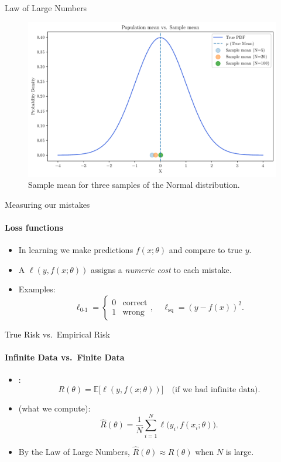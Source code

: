 \begin{frame}{Law of Large Numbers}
  \begin{figure}
    \centering
    \includegraphics[height=0.65\textheight]{images/pop_mean_vs_sample_mean.pdf}
    \caption{Sample mean for three samples of the Normal distribution.}
  \end{figure}
\end{frame}

\begin{frame}{Measuring our mistakes}
  \framesubtitle{Loss functions}
  \begin{itemize}
    \item In learning we make predictions $f(x;\theta)$ and compare to true $y$.
    \item A  $\ell(y, f(x;\theta))$ assigns a \emph{numeric cost} to each mistake.
    \item Examples:
          \[
            \ell_{\text{0-1}} = \begin{cases}0 & \text{correct}\\1 & \text{wrong}\end{cases}
            ,\quad
            \ell_{\text{sq}}=(y - f(x))^2.
          \]
  \end{itemize}
\end{frame}

\begin{frame}{True Risk vs.\ Empirical Risk}
  \framesubtitle{Infinite Data vs.\ Finite Data}
  \begin{itemize}
    \item {}:
          \[
            R(\theta)
            = \mathbb{E}\bigl[\ell(y, f(x;\theta))\bigr]
            \quad\text{(if we had infinite data).}
          \]
    \item {} (what we compute):
          \[
            \hat R(\theta)
            = \frac{1}{N}\sum_{i=1}^N \ell\bigl(y_i, f(x_i;\theta)\bigr).
          \]
    \item By the Law of Large Numbers, $\hat R(\theta)\approx R(\theta)$ when $N$ is large.
  \end{itemize}
\end{frame}

